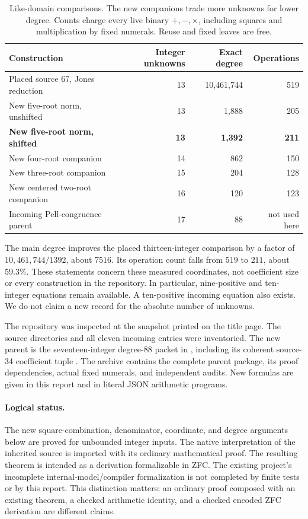 \documentclass[11pt]{article}
\newcommand{\file}[1]{\texttt{\detokenize{#1}}}
\theoremstyle{remark}
\begin{document}
\begin{table}[ht]
\centering\small
\begin{tabular}{lrrr}
\toprule
Construction & Integer unknowns & Exact degree & Operations\\
\midrule
Placed source 67, Jones reduction &13&10,461,744&519\\
New five-root norm, unshifted &13&1,888&205\\
\textbf{New five-root norm, shifted}&\textbf{13}&\textbf{1,392}&\textbf{211}\\
New four-root companion &14&862&150\\
New three-root companion &15&204&128\\
New centered two-root companion &16&120&123\\
Incoming Pell-congruence parent &17&88&not used here\\
\bottomrule
\end{tabular}
\caption{Like-domain comparisons. The new companions trade more unknowns
for lower degree. Counts charge every live binary \(+,-,\times\), including
squares and multiplication by fixed numerals. Reuse and fixed leaves are free.}
\end{table}

The main degree improves the placed thirteen-integer comparison by a factor
of \(10{,}461{,}744/1392\), about \(7516\). Its operation count falls from
\(519\) to \(211\), about \(59.3\%\). These statements concern these measured
coordinates, not coefficient size or every construction in the repository.
In particular, nine-positive and ten-integer equations remain available.
A ten-positive incoming equation also exists. We do not claim a new record
for the absolute number of unknowns.

The repository was inspected at the snapshot printed on the title page.
The source directories and all eleven incoming entries were inventoried.
The new parent is the seventeen-integer degree-88 packet in
\file{con_zfc_pell_congruences_2026-10-23.zip}, including its coherent
source-34 coefficient tuple \cite{repo,parent,source67}. The archive contains
the complete parent package, its proof dependencies, actual fixed numerals,
and independent audits. New formulas are given in this report and in literal
JSON arithmetic programs.

\paragraph{Logical status.}
The new square-combination, denominator, coordinate, and degree arguments
below are proved for unbounded integer inputs. The native interpretation of
the inherited source is imported with its ordinary mathematical proof.
The resulting theorem is intended as a derivation formalizable in ZFC.
The existing project's incomplete internal-model/compiler formalization is
not completed by finite tests or by this report. This distinction matters:
an ordinary proof composed with an existing theorem, a checked arithmetic
identity, and a checked encoded ZFC derivation are different claims.
\end{document}
